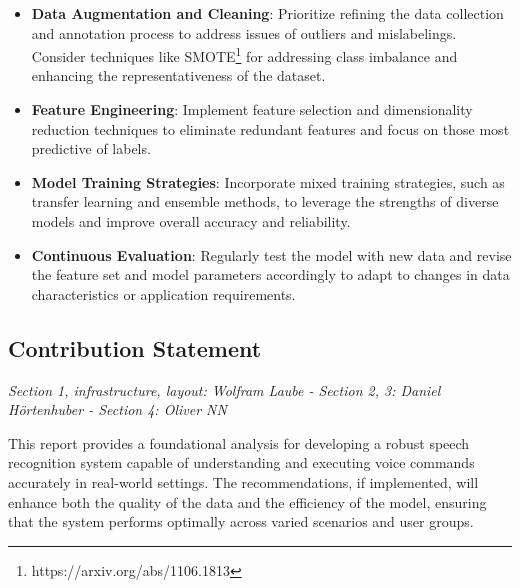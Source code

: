 \begin{itemize}
    \item \textbf{Data Augmentation and Cleaning}:
    Prioritize refining the data collection and annotation process to address issues
    of outliers and mislabelings.
    Consider techniques like SMOTE\footnote{https://arxiv.org/abs/1106.1813} for addressing
    class imbalance and enhancing the representativeness of the dataset.
    \item \textbf{Feature Engineering}:
    Implement feature selection and dimensionality reduction techniques to eliminate
    redundant features and focus on those most predictive of labels.
    \item \textbf{Model Training Strategies}:
    Incorporate mixed training strategies, such as transfer learning and ensemble methods,
    to leverage the strengths of diverse models and improve overall accuracy and reliability.
    \item \textbf{Continuous Evaluation}:
    Regularly test the model with new data and revise the feature set and model parameters
    accordingly to adapt to changes in data characteristics or application requirements.
\end{itemize}

\subsection{Contribution Statement}

\textit{Section 1, infrastructure, layout: Wolfram Laube - Section 2, 3: Daniel Hörtenhuber - Section 4: Oliver NN
}

This report provides a foundational analysis for developing a robust speech recognition system
capable of understanding and executing voice commands accurately in real-world settings.
The recommendations, if implemented, will enhance both the quality of the data and the efficiency
of the model, ensuring that the system performs optimally across varied scenarios and user groups.
